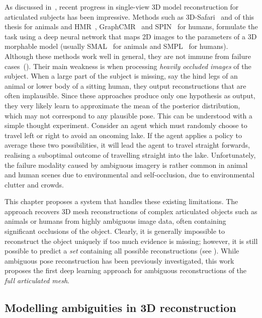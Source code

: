 As discussed in~, recent progress in single-view 3D model reconstruction for articulated subjects has been impressive.
Methods such as 3D-Safari~\cite{xxx} and  of this thesis for animals and HMR~\cite{kanazawa18end-to-end}, GraphCMR~\cite{kolotouros19convolutional} and SPIN~\cite{kolotouros19learning} for humans, formulate the task using a deep neural network that maps 2D images to the parameters of a 3D morphable model (usually SMAL~\cite{zuffi2017menagerie} for animals and SMPL~\cite{loper15smpl} for humans).
Although these methods work well in general, they are not immune from failure cases~().
Their main weakness is when processing \emph{heavily occluded images} of the subject.
When a large part of the subject is missing, say the hind legs of an animal or lower body of a sitting human, they output reconstructions that are often implausible.
Since these approaches produce only one hypothesis as output, they very likely learn to approximate the mean of the posterior distribution, which may not correspond to any plausible pose.
This can be understood with a simple thought experiment. Consider an agent which must randomly choose to travel left or right to avoid an oncoming lake. If the agent applies a policy to average these two possibilities, it will lead the agent to travel straight forwards, realising a suboptimal outcome of travelling straight into the lake.
Unfortunately, the failure modality caused by ambiguous imagery is rather common in animal and human scenes due to environmental and self-occlusion, due to environmental clutter and crowds.

This chapter proposes a system that handles these existing limitations. The approach recovers 3D mesh reconstructions of complex articulated objects such as animals or humans from highly ambiguous image data, often containing significant occlusions of the object.
Clearly, it is generally impossible to reconstruct the object uniquely if too much evidence is missing; however, it is still possible to predict a \emph{set} containing all possible reconstructions (see ).
While ambiguous pose reconstruction has been previously investigated, this work proposes the first deep learning approach for ambiguous reconstructions of the \emph{full articulated mesh}.



\subsection{Modelling ambiguities in 3D reconstruction}

